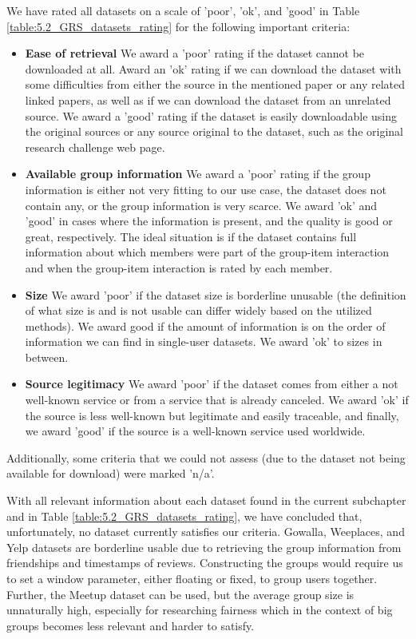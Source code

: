 We have rated all datasets on a scale of 'poor', 'ok', and 'good' in Table \ref{table:5.2_GRS_datasets_rating} for the following important criteria:
\begin{itemize}
    \item \textbf{Ease of retrieval} \newline
        We award a 'poor' rating if the dataset cannot be downloaded at all. Award an 'ok' rating if we can download the dataset with some difficulties from either the source in the mentioned paper or any related linked papers, as well as if we can download the dataset from an unrelated source. We award a 'good' rating if the dataset is easily downloadable using the original sources or any source original to the dataset, such as the original research challenge web page.
    \item \textbf{Available group information} \newline
        We award a 'poor' rating if the group information is either not very fitting to our use case, the dataset does not contain any, or the group information is very scarce. We award 'ok' and 'good' in cases where the information is present, and the quality is good or great, respectively. The ideal situation is if the dataset contains full information about which members were part of the group-item interaction and when the group-item interaction is rated by each member.
    \item \textbf{Size}\newline
        We award 'poor' if the dataset size is borderline unusable (the definition of what size is and is not usable can differ widely based on the utilized methods). We award good if the amount of information is on the order of information we can find in single-user datasets. We award 'ok' to sizes in between.
    \item \textbf{Source legitimacy} \newline
        We award 'poor' if the dataset comes from either a not well-known service or from a service that is already canceled. We award 'ok' if the source is less well-known but legitimate and easily traceable, and finally, we award 'good' if the source is a well-known service used worldwide.
\end{itemize}

Additionally, some criteria that we could not assess (due to the dataset not being available for download) were marked 'n/a'.

With all relevant information about each dataset found in the current subchapter and in Table \ref{table:5.2_GRS_datasets_rating}, we have concluded that, unfortunately, no dataset currently satisfies our criteria. Gowalla, Weeplaces, and Yelp datasets are borderline usable due to retrieving the group information from friendships and timestamps of reviews. Constructing the groups would require us to set a window parameter, either floating or fixed, to group users together. Further, the Meetup dataset can be used, but the average group size is unnaturally high, especially for researching fairness which in the context of big groups becomes less relevant and harder to satisfy.

